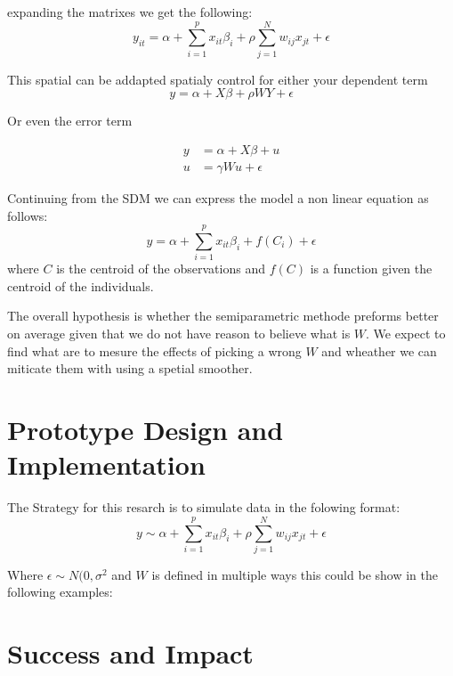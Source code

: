 \documentclass{article}
\begin{document}
expanding the matrixes we get the following:
\begin{equation}
	y_{it} = \alpha + \sum^p_{i=1} x_{it} \beta_i + \rho \sum^N_{j=1} w_{ij} x_{jt} +\epsilon
	\label{eq:SDM_exp}
\end{equation}

This spatial can be addapted spatialy control for either your dependent term
\begin{equation}
	y = \alpha + X \beta + \rho W Y + \epsilon
	\label{eq:SAR}
\end{equation}

Or even the error term

\begin{equation}
	\begin{split}
		y & =\alpha + X \beta + u  \\
		u & =\gamma W u + \epsilon
	\end{split}
	\label{eq:SEM}
\end{equation}

Continuing from the SDM we can express the model a non linear equation as follows:
\begin{equation}
	y = \alpha + \sum^p_{i=1} x_{it} \beta_i + f(C_i) + \epsilon
	\label{eq:tensor}
\end{equation}
where $C$ is the centroid of the observations and $f(C)$ is a function given the centroid of the individuals.



The overall hypothesis is whether the semiparametric methode preforms better
on average given that we do not have reason to believe what is $W$. We expect to find what are to mesure the effects of picking a wrong $W$
and wheather we can miticate them with using a spetial smoother.

\section{Prototype Design and Implementation}

The Strategy for this resarch is to simulate data in the folowing format:
\begin{equation}
	y \sim \alpha + \sum^p_{i=1} x_{it} \beta_i + \rho \sum^N_{j=1} w_{ij} x_{jt} + \epsilon
\end{equation}

Where $\epsilon \sim N(0,\sigma^2$ and $W$ is defined in multiple ways this could be show in the following examples:

\section{Success and Impact}
\end{document}
